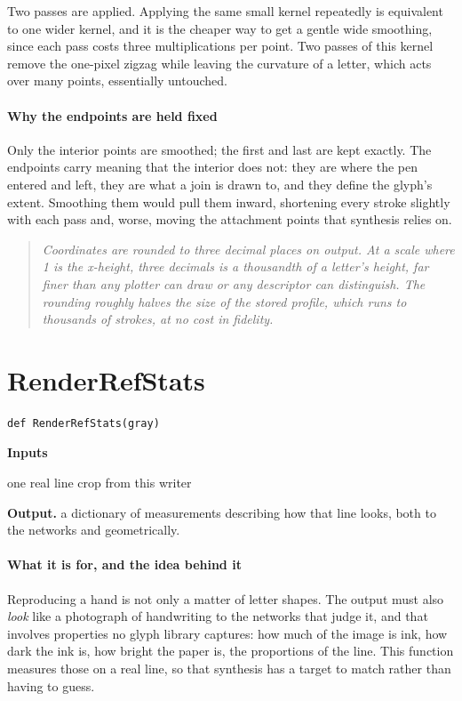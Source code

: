 Two passes are applied. Applying the same small kernel repeatedly is equivalent to one wider kernel, and it is the cheaper way to get a gentle wide smoothing, since each pass costs three multiplications per point. Two passes of this kernel remove the one-pixel zigzag while leaving the curvature of a letter, which acts over many points, essentially untouched.


\paragraph{Why the endpoints are held fixed}
Only the interior points are smoothed; the first and last are kept exactly. The endpoints carry meaning that the interior does not: they are where the pen entered and left, they are what a join is drawn to, and they define the glyph's extent. Smoothing them would pull them inward, shortening every stroke slightly with each pass and, worse, moving the attachment points that synthesis relies on.


\begin{quote}\small\itshape Coordinates are rounded to three decimal places on output. At a scale where 1 is the x-height, three decimals is a thousandth of a letter's height, far finer than any plotter can draw or any descriptor can distinguish. The rounding roughly halves the size of the stored profile, which runs to thousands of strokes, at no cost in fidelity.\end{quote}

\section{RenderRefStats}
\begin{lstlisting}[style=sig]
def RenderRefStats(gray)
\end{lstlisting}

\noindent\textbf{Inputs}
\begin{description}[leftmargin=2.2em,style=nextline,font=\normalfont\ttfamily]\setlength\itemsep{1pt}
  \item[{gray}] \normalfont one real line crop from this writer
\end{description}

\noindent\textbf{Output.} a dictionary of measurements describing how that line looks, both to the networks and geometrically.


\paragraph{What it is for, and the idea behind it}
Reproducing a hand is not only a matter of letter shapes. The output must also \emph{look} like a photograph of handwriting to the networks that judge it, and that involves properties no glyph library captures: how much of the image is ink, how dark the ink is, how bright the paper is, the proportions of the line. This function measures those on a real line, so that synthesis has a target to match rather than having to guess.


